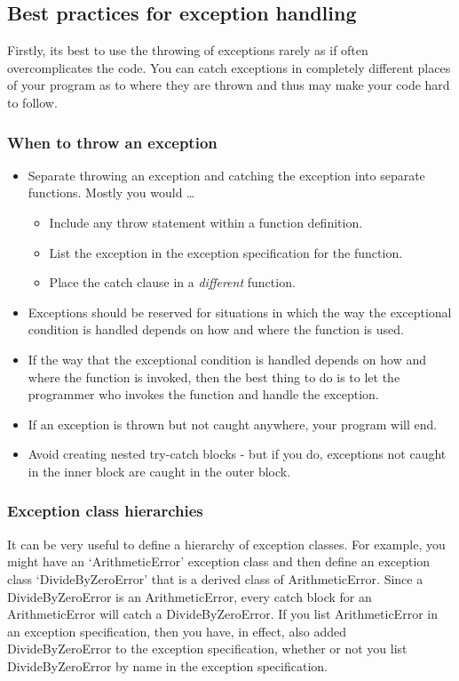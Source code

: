 \subsection{Best practices for exception handling}
Firstly, its best to use the throwing of exceptions rarely as if often overcomplicates the code. You can
catch exceptions in completely different places of your program as to where they are thrown and thus
may make your code hard to follow.

\subsubsection*{When to throw an exception}
\begin{itemize}
	\item Separate throwing an exception and catching the exception into separate functions.
	Mostly you would \ldots
	\begin{itemize}
		\item Include any throw statement within a function definition.
		\item List the exception in the exception specification for the function.
		\item Place the catch clause in a \emph{different} function.
	\end{itemize}
	\item Exceptions should be reserved for situations in which the way the exceptional
	condition is handled depends on how and where the function is used.
	\item If the way that the exceptional condition is handled depends on how and where
	the function is invoked, then the best thing to do is to let the programmer who invokes
	the function and handle the exception.
	\item If an exception is thrown but not caught anywhere, your program will end.
	\item Avoid creating nested try-catch blocks - but if you do, exceptions not caught in the
	inner block are caught in the outer block.
\end{itemize}


\subsubsection*{Exception class hierarchies}
It can be very useful to define a hierarchy of exception classes. For example, you might have an
`ArithmeticError' exception class and then define an exception class `DivideByZeroError' that is a derived
class of ArithmeticError. Since a DivideByZeroError is an ArithmeticError, every catch block for an
ArithmeticError will catch a DivideByZeroError. If you list ArithmeticError in an exception specification, then
you have, in effect, also added DivideByZeroError to the exception specification, whether or not you list
DivideByZeroError by name in the exception specification.


